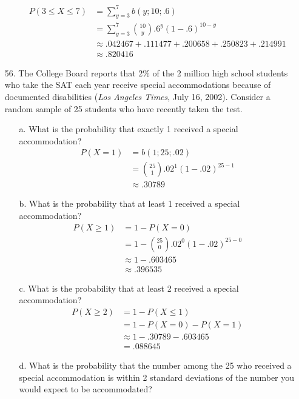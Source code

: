 \documentclass[letterpaper,12pt]{article}
\newcommand{\bp}[3]{%
  \binom{#2}{#1}#3^{#1}(1 - #3)^{#2 - #1}%
}
\begin{document}
\begin{enumerate}
\begin{enumerate}
        \begin{align*}
          P(3 \le X \le 7) &= \sum_{y = 3}^7 b(y; 10; .6) \\
          &= \sum_{y = 3}^7 \bp{y}{10}{.6} \\
          &\approx .042467 + .111477 + .200658 + .250823 + .214991 \\
          &\approx .820416
        \end{align*}
    \end{enumerate}
  \item[56.]
    The College Board reports that 2\% of the 2 million high school students who take the SAT each year receive special accommodations because of documented disabilities (\textit{Los Angeles Times}, July 16, 2002). Consider a random sample of 25 students who have recently taken the test.
    \begin{enumerate}
      \item[a.]
        What is the probability that exactly 1 received a special accommodation?
        \begin{align*}
          P(X = 1) &= b(1; 25; .02) \\
          &= \bp{1}{25}{.02} \\
          &\approx .30789
        \end{align*}
      \item[b.]
        What is the probability that at least 1 received a special accommodation?
        \begin{align*}
          P(X \ge 1) &= 1 - P(X = 0) \\
          &= 1 - \bp{0}{25}{.02} \\
          &\approx 1 - .603465 \\
          &\approx .396535
        \end{align*}
      \item[c.]
        What is the probability that at least 2 received a special accommodation?
        \begin{align*}
          P(X \ge 2) &= 1 - P(X \le 1) \\
          &= 1 - P(X = 0) - P(X = 1) \\
          &\approx 1 - .30789 - .603465 \\
          &= .088645
        \end{align*}
      \item[d.]
        What is the probability that the number among the 25 who received a special accommodation is within 2 standard deviations of the number you would expect to be accommodated?

\end{enumerate}
\end{enumerate}
\end{document}
